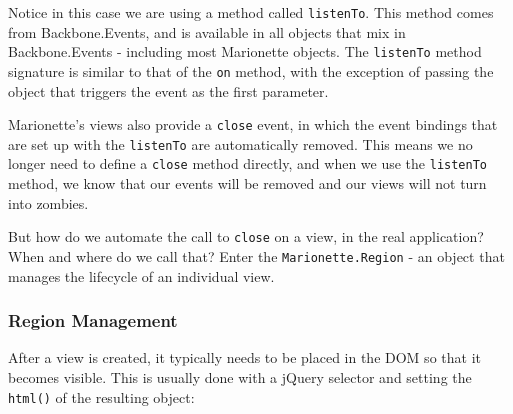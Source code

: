 \documentclass[9pt]{book}
\newenvironment{Shaded}{}{}
\newcommand{\KeywordTok}[1]{\textcolor[rgb]{0.00,0.44,0.13}{\textbf{{#1}}}}
\newcommand{\DataTypeTok}[1]{\textcolor[rgb]{0.56,0.13,0.00}{{#1}}}
\newcommand{\StringTok}[1]{\textcolor[rgb]{0.25,0.44,0.63}{{#1}}}
\newcommand{\CommentTok}[1]{\textcolor[rgb]{0.38,0.63,0.69}{\textit{{#1}}}}
\newcommand{\OtherTok}[1]{\textcolor[rgb]{0.00,0.44,0.13}{{#1}}}
\newcommand{\FunctionTok}[1]{\textcolor[rgb]{0.02,0.16,0.49}{{#1}}}
\newcommand{\NormalTok}[1]{{#1}}
\begin{document}
Notice in this case we are using a method called \texttt{listenTo}. This
method comes from Backbone.Events, and is available in all objects that
mix in Backbone.Events - including most Marionette objects. The
\texttt{listenTo} method signature is similar to that of the \texttt{on}
method, with the exception of passing the object that triggers the event
as the first parameter.

Marionette's views also provide a \texttt{close} event, in which the
event bindings that are set up with the \texttt{listenTo} are
automatically removed. This means we no longer need to define a
\texttt{close} method directly, and when we use the \texttt{listenTo}
method, we know that our events will be removed and our views will not
turn into zombies.

But how do we automate the call to \texttt{close} on a view, in the real
application? When and where do we call that? Enter the
\texttt{Marionette.Region} - an object that manages the lifecycle of an
individual view.

\subsubsection{Region Management}\label{region-management}

After a view is created, it typically needs to be placed in the DOM so
that it becomes visible. This is usually done with a jQuery selector and
setting the \texttt{html()} of the resulting object:

\begin{Shaded}
\end{Shaded}
\end{document}
